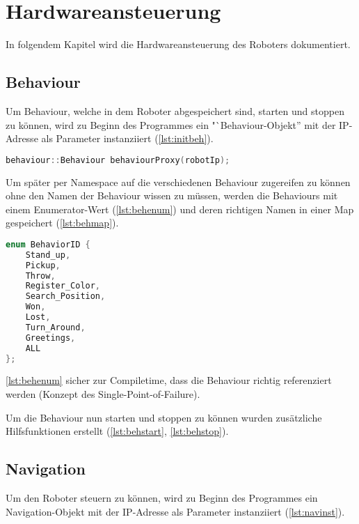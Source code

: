 \chapter{Hardwareansteuerung}

    In folgendem Kapitel wird die Hardwareansteuerung des Roboters dokumentiert.

    \section{Behaviour}

        Um Behaviour, welche in dem Roboter abgespeichert sind, starten und
        stoppen zu können, wird zu Beginn des Programmes ein
        "`Behaviour-Objekt'' mit der \ac{IP}-Adresse als Parameter instanziiert
        (\autoref{lst:initbeh}).

\begin{lstlisting}[language=c++,
                   caption={Initialisierung Behaviour},
                   label={lst:initbeh}]
behaviour::Behaviour behaviourProxy(robotIp);
\end{lstlisting}

        Um später per Namespace auf die verschiedenen Behaviour zugereifen zu
        können ohne den Namen der Behaviour wissen zu müssen, werden die
        Behaviours mit einem Enumerator-Wert (\autoref{lst:behenum}) und deren
        richtigen Namen in einer Map gespeichert (\autoref{lst:behmap}).

\begin{lstlisting}[language=c++,
                   caption={Behaviour Enumerator},
                   label={lst:behenum}]
enum BehaviorID {
    Stand_up,
    Pickup,
    Throw,
    Register_Color,
    Search_Position,
    Won,
    Lost,
    Turn_Around,
    Greetings,
    ALL
};
\end{lstlisting}

        \autoref{lst:behenum} sicher zur Compiletime, dass die Behaviour richtig
        referenziert werden (Konzept des Single-Point-of-Failure).

        Um die Behaviour nun starten und stoppen zu können wurden zusätzliche
        Hilfsfunktionen erstellt
        (\autoref{lst:behstart}, \autoref{lst:behstop}).

    \section{Navigation}

        Um den Roboter steuern zu können, wird zu Beginn des Programmes ein
        Navigation-Objekt mit der \ac{IP}-Adresse als Parameter instanziiert
        (\autoref{lst:navinst}).

